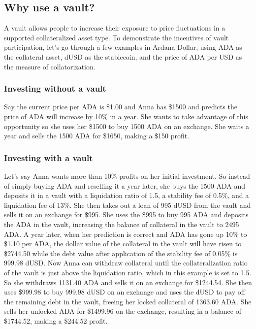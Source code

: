 \documentclass[12pt]{article}
\begin{document}
\subsection{Why use a vault?}

A vault allows people to increase their exposure to price fluctuations in a supported collateralized asset type. To demonstrate the incentives of vault participation, let's go through a few examples in Ardana Dollar, using ADA as the collateral asset, dUSD as the stablecoin, and the price of ADA per USD as the measure of collatorization.

	\subsubsection{Investing without a vault}

Say the current price per ADA is \$1.00 and Anna has \$1500 and predicts the price of ADA will increase by 10\% in a year. She wants to take advantage of this opportunity so she uses her \$1500 to buy 1500 ADA on an exchange. She waits a year and sells the 1500 ADA for \$1650, making a \$150 profit.

	\subsubsection{Investing with a vault}

Let's say Anna wants more than 10\% profits on her initial investment. So instead of simply buying ADA and reselling it a year later, she buys the 1500 ADA and deposits it in a vault with a liquidation ratio of 1.5, a stability fee of 0.5\%, and a liquidation fee of 13\%. She then takes out a loan of 995 dUSD from the vault and sells it on an exchange for \$995. She uses the \$995 to buy 995 ADA and deposits the ADA in the vault, increasing the balance of collateral in the vault to 2495 ADA. A year later, when her prediction is correct and ADA has gone up 10\% to \$1.10 per ADA, the dollar value of the collateral in the vault will have risen to \$2744.50 while the debt value after application of the stability fee of 0.05\% is 999.98 dUSD. Now Anna can withdraw collateral until the collateralization ratio of the vault is just above the liquidation ratio, which in this example is set to 1.5. So she withdraws 1131.40 ADA and sells it on an exchange for \$1244.54. She then uses \$999.98 to buy 999.98 dUSD on an exchange and uses the dUSD to pay off the remaining debt in the vault, freeing her locked collateral of 1363.60 ADA. She sells her unlocked ADA for \$1499.96 on the exchange, resulting in a balance of \$1744.52, making a \$244.52 profit.
\end{document}
